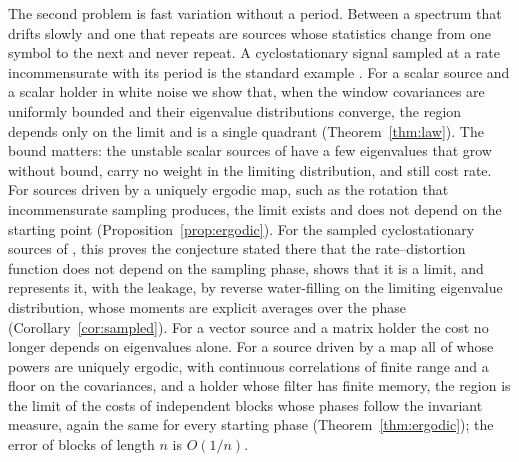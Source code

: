 \documentclass[11pt,onecolumn]{IEEEtran}
\begin{document}
The second problem is fast variation without a period. Between a
spectrum that drifts slowly and one that repeats are sources whose
statistics change from one symbol to the next and never repeat. A
cyclostationary signal sampled at a rate incommensurate with its period
is the standard example \cite{abakasanga2020,tan2024}. For a scalar
source and a scalar holder in white noise we show that, when the window
covariances are uniformly bounded and their eigenvalue distributions
converge, the region depends only on the limit and is a single quadrant
(Theorem~\ref{thm:law}). The bound matters: the unstable scalar sources
of \cite{part3} have a few eigenvalues that grow without bound, carry no
weight in the limiting distribution, and still cost rate. For sources
driven by a uniquely ergodic map, such as the rotation that
incommensurate sampling produces, the limit exists and does not depend
on the starting point (Proposition~\ref{prop:ergodic}). For the sampled
cyclostationary sources of \cite{tan2024}, this proves the conjecture
stated there that the rate--distortion function does not depend on the
sampling phase, shows that it is a limit, and represents it, with the
leakage, by reverse water-filling on the limiting eigenvalue
distribution, whose moments are explicit averages over the phase
(Corollary~\ref{cor:sampled}).
For a vector source and a matrix holder the cost no longer depends on
eigenvalues alone. For a source driven by a map all of whose powers are
uniquely ergodic, with continuous correlations of finite range and a
floor on the covariances, and a holder whose filter has finite memory,
the region is the limit of the costs of independent blocks whose phases
follow the invariant measure, again the same for every starting phase
(Theorem~\ref{thm:ergodic}); the error of blocks of length $n$ is
$O(1/n)$.
\end{document}
